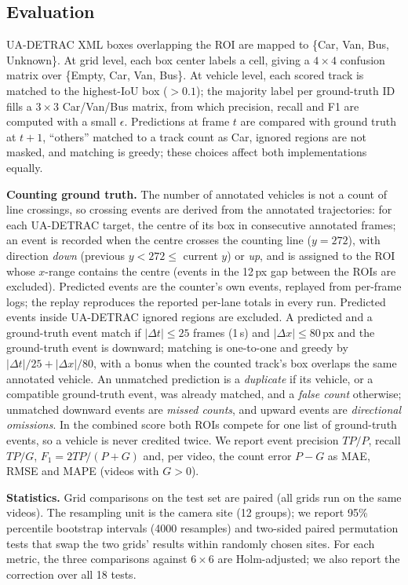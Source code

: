 \documentclass[conference]{IEEEtran}
\begin{document}
\subsection{Evaluation}
\label{sec:eval}
UA-DETRAC XML boxes overlapping the ROI are mapped to \{Car, Van, Bus,
Unknown\}. At grid level, each box center labels a cell, giving a
$4\times4$ confusion matrix over \{Empty, Car, Van, Bus\}. At vehicle
level, each scored track is matched to the highest-IoU box ($>0.1$); the
majority label per ground-truth ID fills a $3\times3$ Car/Van/Bus matrix,
from which precision, recall and F1 are computed with a small
$\epsilon$. Predictions at frame $t$ are compared with ground truth at
$t{+}1$, ``others'' matched to a track count as Car, ignored regions are
not masked, and matching is greedy; these choices affect both implementations
equally.

\textbf{Counting ground truth.} The number of annotated vehicles is not a
count of line crossings, so crossing events are derived from the
annotated trajectories: for each UA-DETRAC target, the centre of its box
in consecutive annotated frames; an event is recorded when the centre
crosses the counting line ($y=272$), with direction \emph{down}
(previous $y<272\le$ current $y$) or \emph{up}, and is assigned to the
ROI whose $x$-range contains the centre (events in the 12\,px gap between
the ROIs are excluded). Predicted events are the counter's own events,
replayed from per-frame logs; the replay reproduces the reported per-lane
totals in every run. Predicted events inside UA-DETRAC ignored regions
are excluded. A predicted and a ground-truth event match if
$|\Delta t|\le25$ frames (1\,s) and $|\Delta x|\le80$\,px and the
ground-truth event is downward; matching is one-to-one and greedy by
$|\Delta t|/25+|\Delta x|/80$, with a bonus when the counted track's box
overlaps the same annotated vehicle. An unmatched prediction is a
\emph{duplicate} if its vehicle, or a compatible ground-truth event, was
already matched, and a \emph{false count} otherwise; unmatched downward
events are \emph{missed counts}, and upward events are \emph{directional
omissions}. In the combined score both ROIs compete for one list of
ground-truth events, so a vehicle is never credited twice. We report
event precision $TP/P$, recall $TP/G$, $F_1=2TP/(P+G)$ and, per video,
the count error $P-G$ as MAE, RMSE and MAPE (videos with $G>0$).

\textbf{Statistics.} Grid comparisons on the test set are paired (all grids
run on the same videos). The resampling unit is the camera site (12
groups); we report 95\% percentile bootstrap intervals (4000 resamples)
and two-sided paired permutation tests that swap the two grids' results
within randomly chosen sites. For each metric, the three comparisons
against $6{\times}6$ are Holm-adjusted; we also report the correction
over all 18 tests.
\end{document}
